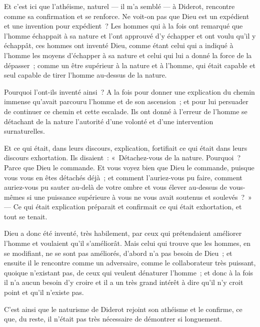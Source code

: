 \documentclass[french,twoside]{book} %
\begin{document}
\noindent  Et c’est ici que l’athéisme, naturel — il m’a semblé — à Diderot, rencontre comme sa confirmation et se renforce. Ne voit-on pas que Dieu est un expédient et une invention pour expédient ? Les hommes qui à la fois ont remarqué que l’homme échappait à sa nature et l’ont approuvé d’y échapper et ont voulu qu’il y échappât, ces hommes ont inventé Dieu, comme étant celui qui a indiqué à l’homme les moyens d’échapper à sa nature et celui qui lui a donné la force de la dépasser ; comme un être supérieur à la nature et à l’homme, qui était capable et seul capable de tirer l’homme au-dessus de la nature.\par
Pourquoi l’ont-ils inventé ainsi ? A la fois pour donner une explication du chemin immense qu’avait parcouru l’homme et de son ascension ; et pour lui persuader de continuer ce chemin et cette escalade. Ils ont donné à l’erreur de l’homme se détachant de la nature l’autorité d’une volonté et d’une intervention surnaturelles.\par
Et ce qui était, dans leurs discours, explication, fortifiait ce qui était dans leurs discours exhortation. Ils disaient : « Détachez-vous de la nature. Pourquoi ? Parce que Dieu le commande. Et vous voyez bien que Dieu le commande, puisque vous vous en êtes détachés déjà ; et comment l’auriez-vous pu faire, comment auriez-vous pu sauter  au-delà de votre ombre et vous élever au-dessus de vous-mêmes si une puissance supérieure à vous ne vous avait soutenus et soulevés ? » — Ce qui était explication préparait et confirmait ce qui était exhortation, et tout se tenait.\par
Dieu a donc été inventé, très habilement, par ceux qui prétendaient améliorer l’homme et voulaient qu’il s’améliorât. Mais celui qui trouve que les hommes, en se modifiant, ne se sont pas améliorés, d’abord n’a pas besoin de Dieu ; et ensuite il le rencontre comme un adversaire, comme le collaborateur très puissant, quoique n’existant pas, de ceux qui veulent dénaturer l’homme ; et donc à la fois il n’a aucun besoin d’y croire et il a un très grand intérêt à dire qu’il n’y croit point et qu’il n’existe pas.\par
C’est ainsi que le naturisme de Diderot rejoint son athéisme et le confirme, ce que, du reste, il n’était pas très nécessaire de démontrer si longuement.\par
\end{document}
